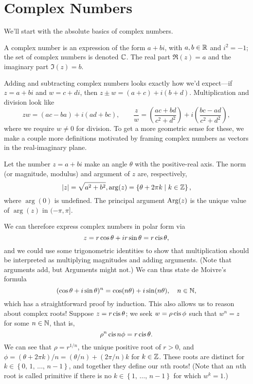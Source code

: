 \documentclass[../m136main.tex]{subfiles}
\begin{document}
\chapter{Complex Numbers}
We'll start with the absolute basics of complex numbers.

\begin{definition}
    A complex number is an expression of the form $a + bi$, with $a,b \in \mathbb{R}$ and $i^2 = -1$; the set of complex numbers is denoted $\mathbb{C}$.
    The real part $\Re(z) = a$ and the imaginary part $\Im(z) = b$.
\end{definition}

Adding and subtracting complex numbers looks exactly how we'd expect---if $z = a + bi$ and $w = c + di$, then $z \pm w = (a + c) + i (b + d)$.
Multiplication and division look like
\[ zw = (ac - ba) + i(ad + bc), \qquad \frac{z}{w} = \left( \frac{ac + bd}{c^2 + d^2} \right) + i \left( \frac{bc - ad}{c^2 + d^2} \right), \]
where we require $w \neq 0$ for division.
To get a more geometric sense for these, we make a couple more definitions motivated by framing complex numbers as vectors in the real-imaginary plane.

\begin{definition}
    Let the number $z = a + bi$ make an angle $\theta$ with the positive-real axis.
    The norm (or magnitude, modulus) and argument of $z$ are, respectively,
    \[ |z| = \sqrt{a^2+ b^2}, \arg(z) = \left\{ \theta + 2\pi k \mid k \in \mathbb{Z} \right\}, \]
    where $\arg(0)$ is undefined.
    The principal argument $\operatorname{Arg}(z)$ is the unique value of $\arg(z)$ in $(-\pi, \pi]$.
\end{definition}

We can therefore express complex numbers in polar form via
\[ z = r \cos \theta + i r \sin \theta = r \operatorname{cis} \theta, \]
and we could use some trigonometric identities to show that multiplication should be interpreted as multiplying magnitudes and adding arguments.
(Note that arguments add, but Arguments might not.)
We can thus state de Moivre's formula
\[ (\cos \theta + i \sin \theta)^{n} = \cos (n \theta) + i \sin(n \theta), \quad n \in \mathbb{N}, \]
which has a straightforward proof by induction.
This also allows us to reason about complex roots!
Suppose $z = r \operatorname{cis} \theta$; we seek $w = \rho \operatorname{cis} \phi$ such that $w^{n} = z$ for some $n \in \mathbb{N}$, that is,
\[ \rho^{n} \operatorname{cis} n\phi = r \operatorname{cis} \theta. \]
We can see that $\rho = r^{1 / n}$, the unique positive root of $r > 0$, and $\phi = (\theta + 2\pi k) / n = (\theta / n) + (2\pi / n)k$ for $k \in \mathbb{Z}$.
These roots are distinct for $k \in \left\{ 0, \, 1, \, \ldots, \, n-1 \right\}$, and together they define our $n$th roots!
(Note that an $n$th root is called primitive if there is no $k \in \left\{ 1, \, \ldots, \, n-1 \right\}$ for which $w^{k} = 1$.)
\end{document}
